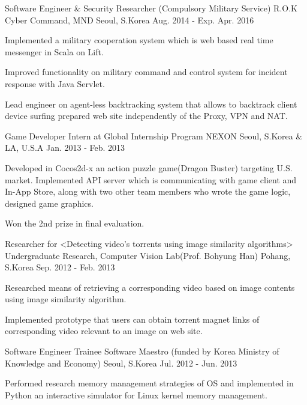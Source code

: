\begin{cventries}
  \cventry
    {Software Engineer \& Security Researcher (Compulsory Military Service)}
    {R.O.K Cyber Command, MND}
    {Seoul, S.Korea}
    {Aug. 2014 - Exp. Apr. 2016}
    {
      \begin{cvitems}
        \item {Implemented a military cooperation system which is web based real time messenger in Scala on Lift.}
        \item {Improved functionality on military command and control system for incident response with Java Servlet.}
        \item {Lead engineer on agent-less backtracking system that allows to backtrack client device surfing prepared web site independently of the Proxy, VPN and NAT.}
      \end{cvitems}
    }
  \cventry
    {Game Developer Intern at Global Internship Program}
    {NEXON}
    {Seoul, S.Korea \& LA, U.S.A}
    {Jan. 2013 - Feb. 2013}
    {
      \begin{cvitems}
        \item {Developed in Cocos2d-x an action puzzle game(Dragon Buster) targeting U.S. market. Implemented API server which is communicating with game client and In-App Store, along with two other team members who wrote the game logic, designed game graphics.}
        \item {Won the 2nd prize in final evaluation.}
      \end{cvitems}
    }
  \cventry
    {Researcher for <Detecting video’s torrents using image similarity algorithms>}
    {Undergraduate Research, Computer Vision Lab(Prof. Bohyung Han)}
    {Pohang, S.Korea}
    {Sep. 2012 - Feb. 2013}
    {
      \begin{cvitems}
        \item {Researched means of retrieving a corresponding video based on image contents using image similarity algorithm.}
        \item {Implemented prototype that users can obtain torrent magnet links of corresponding video relevant to an image on web site.}
      \end{cvitems} 
    }
  \cventry
    {Software Engineer Trainee}
    {Software Maestro (funded by Korea Ministry of Knowledge and Economy)}
    {Seoul, S.Korea}
    {Jul. 2012 - Jun. 2013}
    {
      \begin{cvitems}
        \item {Performed research memory management strategies of OS and implemented in Python an interactive simulator for Linux kernel memory management.}

\end{cvitems}}
\end{cventries}
